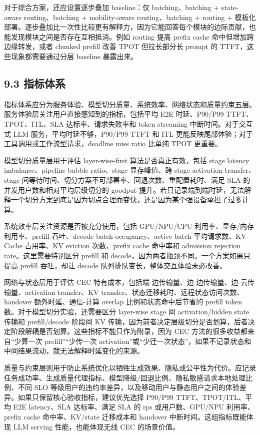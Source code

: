 对于综合方案，还应设置逐步叠加 baseline：仅 batching、batching + state-aware routing、batching + mobility-aware routing、batching + routing + 模板化部署。逐步叠加比一次性比较更有解释力，因为它能回答每个模块的边际贡献，也能发现模块之间是否存在互相抵消。例如 routing 提高 prefix cache 命中但增加跨边缘转发，或者 chunked prefill 改善 TPOT 但拉长部分长 prompt 的 TTFT，这些现象都需要通过分层 baseline 暴露出来。


\subsection*{9.3 指标体系}

指标体系应分为服务体验、模型切分质量、系统效率、网络状态和质量约束五层。服务体验层关注用户直接感知到的指标，包括平均 E2E 时延、P90/P99 TTFT、TPOT、ITL、SLA 达标率、请求失败率和 token streaming 中断时间。对于交互式 LLM 服务，平均时延不够，P90/P99 TTFT 和 ITL 更能反映尾部体验；对于工具调用或工作流型请求，deadline miss ratio 比单纯 TPOT 更重要。

模型切分质量层用于评估 layer-wise-first 算法是否真正有效，包括 stage latency imbalance、pipeline bubble ratio、stage 显存峰值、跨 stage activation transfer、stage 间等待时间、切分方案不可部署率、回退次数、重配置耗时、满足 SLA 的并发用户数和相对平均层级切分的 goodput 提升。若只记录端到端时延，无法解释一个切分方案到底是因为切点合理而变快，还是因为某个强设备承担了过多计算。

系统效率层关注资源是否被充分使用，包括 GPU/NPU/CPU 利用率、显存/内存利用率、prefill 吞吐、decode batch occupancy、active batch 平均请求数、KV Cache 占用率、KV eviction 次数、prefix cache 命中率和 admission rejection rate。这里需要特别区分 prefill 和 decode，因为两者瓶颈不同。一个方案如果只提高 prefill 吞吐，却让 decode 队列排队变长，整体交互体验未必改善。

网络与状态层用于评估 CEC 特有成本，包括端-边传输量、边-边传输量、边-云传输量、activation transfer、KV transfer、状态迁移耗时、远程状态访问次数、handover 额外时延、通信-计算 overlap 比例和状态命中后节省的 prefill token 数。对于模型切分实验，还需要区分 layer-wise stage 间 activation/hidden state 传输和 prefill/decode 阶段间 KV 传输，因为前者决定层级切分是否划算，后者决定阶段解耦是否划算。这些指标不能只作为附录，因为 CEC 方法的很多收益都来自“少算一次 prefill”“少传一次 activation”或“少迁一次状态”，如果不记录状态和中间结果流动，就无法解释时延变化的来源。

质量与约束层则用于防止系统优化以牺牲生成效果、隐私或公平性为代价。应记录任务成功率、生成质量代理指标、模型降级/回退比例、隐私敏感请求本地处理比例、不同 SLO 等级用户的违约率差异，以及移动用户与静态用户之间的体验差异。如果只保留核心验收指标，建议优先选择 P90/P99 TTFT、TPOT/ITL、平均 E2E latency、SLA 达标率、满足 SLA 的 rps 或用户数、GPU/NPU 利用率、prefix cache 命中率、KV/state 迁移成本和 handover 中断时间。这组指标既能体现 LLM serving 性能，也能体现无线 CEC 的场景价值。


